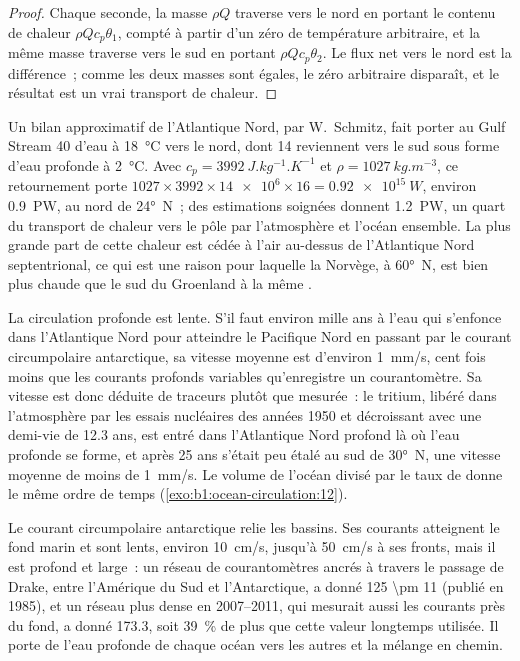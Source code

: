 \begin{proof}
Chaque seconde, la masse $\rho Q$ traverse vers le nord en portant le contenu de chaleur $\rho Q
c_p\theta_1$, compté à partir d'un zéro de température arbitraire, et la même masse
traverse vers le sud en portant $\rho Q c_p\theta_2$. Le flux net vers le nord est la
différence~; comme les deux masses sont égales, le zéro arbitraire disparaît, et le
résultat est un vrai transport de chaleur.
\end{proof}

Un bilan approximatif de l'Atlantique Nord, par W.~Schmitz, fait porter au Gulf Stream
\qty{40}{\sverdrup} d'eau à \qty{18}{\celsius} vers le nord, dont
\qty{14}{\sverdrup} reviennent vers le sud sous forme d'eau profonde à \qty{2}{\celsius}. Avec $c_p =
\qty{3992}{J.kg^{-1}.K^{-1}}$ et $\rho = \qty{1027}{kg.m^{-3}}$, ce retournement
porte $1027 \times 3992 \times \num{14e6} \times 16 = \qty{0.92e15}{W}$, environ
\qty{0.9}{PW}, au nord de \ang{24}~N~; des estimations soignées donnent \qty{1.2}{PW}, un
quart du transport de chaleur vers le pôle par l'atmosphère et l'océan
ensemble. La plus grande part de cette chaleur est cédée à l'air au-dessus de l'Atlantique Nord septentrional, ce
qui est une raison pour laquelle la Norvège, à \ang{60}~N, est bien plus chaude que le sud du
Groenland à la même .

La circulation profonde est lente. S'il faut environ mille ans à l'eau qui s'enfonce
dans l'Atlantique Nord pour atteindre le Pacifique Nord en passant par le courant circumpolaire
antarctique, sa vitesse moyenne est d'environ \qty{1}{mm/s}, cent fois moins que les
courants profonds variables qu'enregistre un courantomètre. Sa vitesse est donc déduite
de traceurs plutôt que mesurée~: le tritium, libéré dans l'atmosphère par les
essais nucléaires des années 1950 et décroissant avec une demi-vie de 12.3 ans, est entré dans
l'Atlantique Nord profond là où l'eau profonde se forme, et après 25 ans s'était peu étalé
au sud de \ang{30}~N, une vitesse moyenne de moins de \qty{1}{mm/s}. Le volume de l'océan
divisé par le taux de  donne le même ordre de temps
(\cref{exo:b1:ocean-circulation:12}).

Le courant circumpolaire antarctique relie les bassins. Ses courants atteignent le fond marin
et sont lents, environ \qty{10}{cm/s}, jusqu'à \qty{50}{cm/s} à ses fronts, mais il est
profond et large~: un réseau de courantomètres ancrés à travers le passage de Drake,
entre l'Amérique du Sud et l'Antarctique, a donné \qty[uncertainty-mode=separate]{125 \pm
11}{\sverdrup} (publié en 1985), et un réseau plus dense en 2007--2011,
qui mesurait aussi les courants près du fond, a donné \qty{173.3}{\sverdrup},
soit \qty{39}{\percent} de plus que cette valeur longtemps utilisée. Il porte de l'eau profonde de chaque
océan vers les autres et la mélange en chemin.

